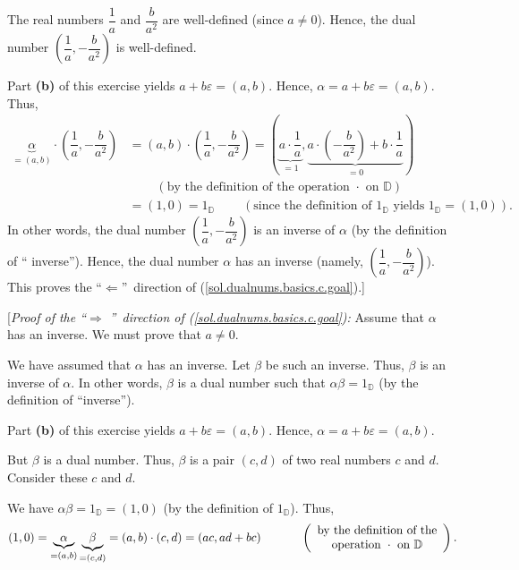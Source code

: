 \documentclass[paper=a4, fontsize=12pt]{scrartcl}%
\theoremstyle{plainsl}
\theoremstyle{definition}
\theoremstyle{remark}
\begin{document}
The real numbers $\dfrac{1}{a}$ and $\dfrac{b}{a^{2}}$ are well-defined (since
$a\neq0$). Hence, the dual number $\left(  \dfrac{1}{a},-\dfrac{b}{a^{2}%
}\right)  $ is well-defined.

Part \textbf{(b)} of this exercise yields $a+b\varepsilon=\left(  a,b\right)
$. Hence, $\alpha=a+b\varepsilon=\left(  a,b\right)  $. Thus,%
\begin{align*}
\underbrace{\alpha}_{=\left(  a,b\right)  }\cdot\left(  \dfrac{1}{a}%
,-\dfrac{b}{a^{2}}\right)   &  =\left(  a,b\right)  \cdot\left(  \dfrac{1}%
{a},-\dfrac{b}{a^{2}}\right)  =\left(  \underbrace{a\cdot\dfrac{1}{a}}%
_{=1},\underbrace{a\cdot\left(  -\dfrac{b}{a^{2}}\right)  +b\cdot\dfrac{1}{a}%
}_{=0}\right) \\
&  \ \ \ \ \ \ \ \ \ \ \left(  \text{by the definition of the operation }%
\cdot\text{ on }\mathbb{D}\right) \\
&  =\left(  1,0\right)  =1_{\mathbb{D}}\ \ \ \ \ \ \ \ \ \ \left(  \text{since
the definition of }1_{\mathbb{D}}\text{ yields }1_{\mathbb{D}}=\left(
1,0\right)  \right)  .
\end{align*}
In other words, the dual number $\left(  \dfrac{1}{a},-\dfrac{b}{a^{2}%
}\right)  $ is an inverse of $\alpha$ (by the definition of \textquotedblleft
inverse\textquotedblright). Hence, the dual number $\alpha$ has an inverse
(namely, $\left(  \dfrac{1}{a},-\dfrac{b}{a^{2}}\right)  $). This proves the
\textquotedblleft$\Longleftarrow$\textquotedblright\ direction of
(\ref{sol.dualnums.basics.c.goal}).]

[\textit{Proof of the \textquotedblleft}$\Longrightarrow$%
\textit{\textquotedblright\ direction of (\ref{sol.dualnums.basics.c.goal}):}
Assume that $\alpha$ has an inverse. We must prove that $a\neq0$.

We have assumed that $\alpha$ has an inverse. Let $\beta$ be such an inverse.
Thus, $\beta$ is an inverse of $\alpha$. In other words, $\beta$ is a dual
number such that $\alpha\beta=1_{\mathbb{D}}$ (by the definition of
\textquotedblleft inverse\textquotedblright).

Part \textbf{(b)} of this exercise yields $a+b\varepsilon=\left(  a,b\right)
$. Hence, $\alpha=a+b\varepsilon=\left(  a,b\right)  $.

But $\beta$ is a dual number. Thus, $\beta$ is a pair $\left(  c,d\right)  $
of two real numbers $c$ and $d$. Consider these $c$ and $d$.

We have $\alpha\beta=1_{\mathbb{D}}=\left(  1,0\right)  $ (by the definition
of $1_{\mathbb{D}}$). Thus,
\[
\left(  1,0\right)  =\underbrace{\alpha}_{=\left(  a,b\right)  }%
\underbrace{\beta}_{=\left(  c,d\right)  }=\left(  a,b\right)  \cdot\left(
c,d\right)  =\left(  ac,ad+bc\right)  \ \ \ \ \ \ \ \ \ \ \left(
\begin{array}
[c]{c}%
\text{by the definition of the}\\
\text{operation }\cdot\text{ on }\mathbb{D}%
\end{array}
\right)  .
\]
\end{document}
